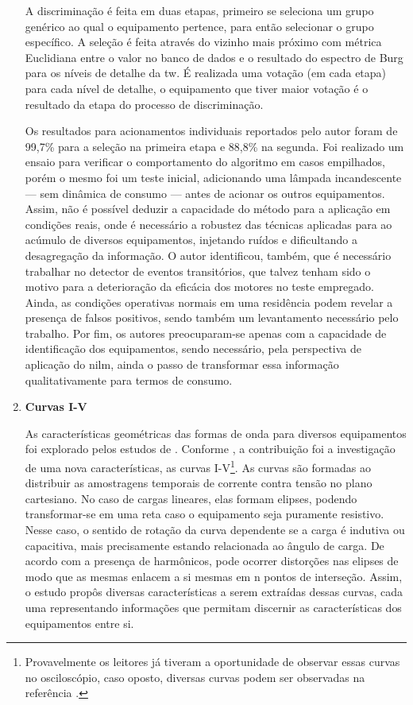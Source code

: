 \begin{enumerate}[label=\textbf{2.\arabic*},wide=\parindent]
A discriminação é feita em duas etapas, primeiro se seleciona um grupo
genérico ao qual o equipamento pertence, para então selecionar o grupo
específico. A seleção é feita através do vizinho mais próximo com
métrica Euclidiana entre o valor no banco de dados e o resultado do
espectro de Burg para os níveis de detalhe da \gls{tw}. É realizada
uma votação (em cada etapa) para cada nível de detalhe, o equipamento
que tiver maior votação é o resultado da etapa do processo de
discriminação.

Os resultados para acionamentos individuais reportados pelo autor
foram de 99,7\% para a seleção na primeira etapa e 88,8\% na segunda.
Foi realizado um ensaio para verificar o comportamento do algoritmo em
casos empilhados, porém o mesmo foi um teste inicial,
adicionando uma lâmpada incandescente --- sem dinâmica de consumo --- 
antes de acionar os outros equipamentos.  Assim, não é possível
deduzir a capacidade do método para a aplicação em condições reais,
onde é necessário a robustez das técnicas aplicadas para ao
acúmulo de diversos equipamentos, injetando ruídos e dificultando
a desagregação da informação. O autor identificou, também, que é
necessário trabalhar no detector de eventos transitórios, que talvez
tenham sido o motivo para a deterioração da eficácia dos motores no
teste empregado. Ainda, as condições operativas normais em uma
residência podem revelar a presença de falsos positivos, sendo também
um levantamento necessário pelo trabalho. Por fim, os autores
preocuparam-se apenas com a capacidade de identificação dos equipamentos,
sendo necessário, pela perspectiva de aplicação do \gls{nilm}, ainda o
passo de transformar essa informação qualitativamente para termos de
consumo.

\item \textbf{Curvas I-V}
\label{nilm:curvas_iv}

As características geométricas das formas de onda para diversos
equipamentos foi explorado pelos estudos de
\citet{nilm_lee_2004_32,nilm_lam_2007_33}. Conforme
\cite{nilm_zeifman_review_2011}, a contribuição foi a investigação de
uma nova características, as curvas I-V\footnote{Provavelmente os
leitores já tiveram a oportunidade de observar essas curvas no
osciloscópio, caso oposto, diversas curvas podem ser observadas 
na referência \cite{nilm_lam_2007_33}.}. As curvas são formadas ao
distribuir as amostragens temporais de corrente contra tensão no plano
cartesiano. No caso de cargas lineares, elas formam elipses, podendo
transformar-se em uma reta caso o equipamento seja puramente resistivo.
Nesse caso, o sentido de rotação da curva dependente se a carga é
indutiva ou capacitiva, mais precisamente estando relacionada ao
ângulo de carga. De acordo com a presença de harmônicos, pode ocorrer
distorções nas elipses de modo que as mesmas enlacem a si mesmas em n
pontos de interseção.  Assim, o estudo propôs diversas características
a serem extraídas dessas curvas, cada uma representando
informações que permitam discernir as características dos equipamentos
entre si.


\end{enumerate}
